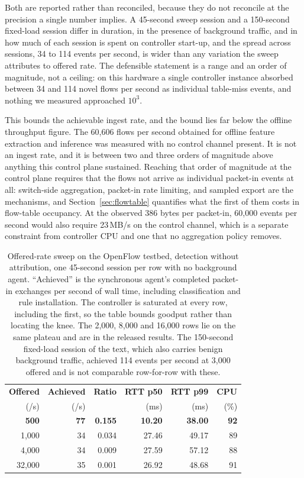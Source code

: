 \documentclass{ieeeaccess}
\begin{document}
Both are reported rather than reconciled, because they do not reconcile at the
precision a single number implies.
A 45-second sweep session and a 150-second fixed-load session differ in duration,
in the presence of background traffic, and in how much of each session is spent
on controller start-up, and the spread across sessions, 34 to 114 events per
second, is wider than any variation the sweep attributes to offered rate. The
defensible statement is a range and an order of magnitude, not a ceiling: on this
hardware a single controller instance absorbed between 34 and 114 novel flows per
second as individual table-miss events, and nothing we measured approached $10^3$.

This bounds the achievable ingest rate, and the bound lies far below the
offline throughput figure. The 60,606 flows per second obtained for offline
feature extraction and inference was measured with no control channel present.
It is not an ingest rate, and it is between two and three orders of magnitude
above anything this control plane sustained. Reaching that order of
magnitude at the control plane requires that the flows not arrive as individual
packet-in events at all: switch-side aggregation, packet-in rate limiting, and
sampled export are the mechanisms, and Section~\ref{sec:flowtable} quantifies
what the first of them costs in flow-table occupancy. At the observed 386 bytes
per packet-in, 60,000 events per second would also require 23\,MB/s on the
control channel, which is a separate constraint from controller CPU and one that
no aggregation policy removes.

\begin{table}[!t]
\caption{Offered-rate sweep on the OpenFlow testbed, detection without
attribution, one 45-second session per row with no background agent.
``Achieved'' is the synchronous agent's completed packet-in exchanges per second
of wall time, including classification and rule installation. The controller is
saturated at every row, including the first, so the table bounds goodput rather
than locating the knee. The 2,000, 8,000 and 16,000 rows lie on the same plateau
and are in the released results. The 150-second fixed-load session of the text,
which also carries benign background traffic, achieved 114 events per second at
3,000 offered and is not comparable row-for-row with these.}
\centering
\label{tab:saturation}
\footnotesize
\setlength{\tabcolsep}{4pt}
\renewcommand{\arraystretch}{1.15}
\begin{tabular}{@{}rrrrrr@{}}
\toprule
\textbf{Offered} & \textbf{Achieved} & \textbf{Ratio} &
\textbf{RTT p50} & \textbf{RTT p99} & \textbf{CPU} \\
(/s) & (/s) & & (ms) & (ms) & (\%) \\
\midrule
\textbf{500}  & \textbf{77} & \textbf{0.155} & \textbf{10.20} & \textbf{38.00} & \textbf{92} \\
1,000  & 34 & 0.034 & 27.46 & 49.17 & 89 \\
4,000  & 34 & 0.009 & 27.59 & 57.12 & 88 \\
32,000 & 35 & 0.001 & 26.92 & 48.68 & 91 \\
\bottomrule
\end{tabular}
\end{table}
\end{document}
